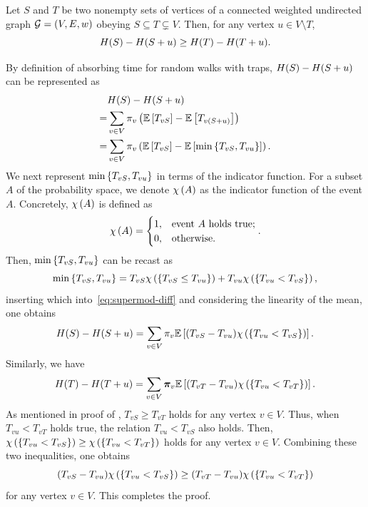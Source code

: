 \documentclass[10pt,twocolumn,twoside]{IEEEtran}
\begin{document}
\begin{theorem}\label{thm:supermod}
    Let \(S\) and \(T\) be two  nonempty sets of vertices of a connected weighted undirected graph \(\mathcal{G}=(V,E,w)\) obeying  \(S\subseteq T\subsetneq V\). Then, for any vertex \(u\in V\setminus T\),
    \begin{equation*}
        H(S)-H(S+u)\ge H(T)-H(T+u).
    \end{equation*}
\end{theorem}
\begin{IEEEproof}
    By definition of absorbing time for  random walks with traps,  \(H(S)-H(S+u)\) can be represented as
    \begin{equation}\label{eq:supermod-diff}
        \begin{split}
            &H(S)-H(S+u)\\
            =&\sum_{v\in V}\pi_v\left( \mathbb{E}\left[T_{vS}\right]-\mathbb{E}\left[T_{v\left( S+u \right)}\right] \right)\\
            =&\sum_{v\in V}\pi_v\left( \mathbb{E}\left[T_{vS}\right]-\mathbb{E}\left[\min\left\{T_{vS},T_{vu} \right\}\right] \right).
        \end{split}
    \end{equation}
    We next represent \(\min\left\{T_{vS},T_{vu} \right\}\)  in terms of  the indicator function.  For a subset \(A\) of the probability space, we denote \(\chi\left( A \right)\) as the indicator function of the event \(A\). Concretely, \(\chi\left( A \right)\) is defined as
    \begin{equation*}
        \chi\left( A \right)=
        \begin{cases}
            1, & \text{event }A\text{ holds true;} \\
            0, & \text{otherwise.}
        \end{cases}.
    \end{equation*}
    Then, \(\min\left\{T_{vS},T_{vu} \right\}\) can
    be recast as
    \begin{equation*}
        \min\left\{T_{vS},T_{vu} \right\}=T_{vS}\chi\left( \left\{T_{vS}\le T_{vu} \right\} \right)+T_{vu}\chi\left( \left\{T_{vu}<T_{vS} \right\} \right),
    \end{equation*}
    inserting which into~\eqref{eq:supermod-diff}  and considering  the linearity of the mean, one obtains
    \begin{equation*}
        H(S)-H(S+u)=\sum_{v\in V}\pi_v\mathbb{E}\left[(T_{vS}-T_{vu})\chi\left( \left\{T_{vu}<T_{vS} \right\} \right)\right].
    \end{equation*}
    Similarly, we have
    \[H(T)-H(T+u)=\sum_{v\in V}\boldsymbol{\pi}_v\mathbb{E}\left[(T_{vT}-T_{vu})\chi\left( \left\{T_{vu}<T_{vT} \right\} \right)\right].\]
    As mentioned in proof of , \(T_{vS}\ge T_{vT}\) holds for any vertex \(v\in V\).
    Thus, when \(T_{vu}<T_{vT}\) holds true, the relation \(T_{vu}<T_{vS}\) also holds.  Then, \(\chi\left( \left\{T_{vu}<T_{vS} \right\} \right)\ge\chi\left( \left\{T_{vu}<T_{vT} \right\} \right)\) holds for any vertex \(v\in V\).
    Combining these two inequalities, one obtains
    \[(T_{vS}-T_{vu})\chi\left( \left\{T_{vu}<T_{vS} \right\} \right)\ge(T_{vT}-T_{vu})\chi\left( \left\{T_{vu}<T_{vT} \right\} \right)\]
    for any vertex \(v\in V\). This completes the proof.
\end{IEEEproof}
\end{document}
